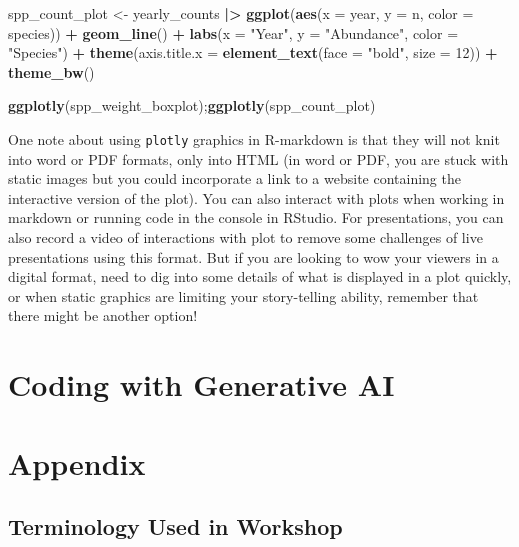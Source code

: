 \documentclass[
  10pt,
  letterpaper,
  twoside,
  openright]{book}
\newenvironment{Shaded}{\begin{snugshade}}{\end{snugshade}}
\newcommand{\AttributeTok}[1]{\textcolor[rgb]{0.13,0.29,0.53}{#1}}
\newcommand{\DecValTok}[1]{\textcolor[rgb]{0.00,0.00,0.81}{#1}}
\newcommand{\FunctionTok}[1]{\textcolor[rgb]{0.13,0.29,0.53}{\textbf{#1}}}
\newcommand{\NormalTok}[1]{#1}
\newcommand{\OtherTok}[1]{\textcolor[rgb]{0.56,0.35,0.01}{#1}}
\newcommand{\SpecialCharTok}[1]{\textcolor[rgb]{0.81,0.36,0.00}{\textbf{#1}}}
\newcommand{\StringTok}[1]{\textcolor[rgb]{0.31,0.60,0.02}{#1}}
\begin{document}
\begin{Shaded}
\begin{Highlighting}[]
\NormalTok{spp\_count\_plot }\OtherTok{\textless{}{-}}\NormalTok{ yearly\_counts }\SpecialCharTok{|\textgreater{}}
  \FunctionTok{ggplot}\NormalTok{(}\FunctionTok{aes}\NormalTok{(}\AttributeTok{x =}\NormalTok{ year, }\AttributeTok{y =}\NormalTok{ n, }\AttributeTok{color =}\NormalTok{ species)) }\SpecialCharTok{+}
  \FunctionTok{geom\_line}\NormalTok{() }\SpecialCharTok{+} 
  \FunctionTok{labs}\NormalTok{(}\AttributeTok{x =} \StringTok{"Year"}\NormalTok{, }
       \AttributeTok{y =} \StringTok{"Abundance"}\NormalTok{, }
       \AttributeTok{color =} \StringTok{"Species"}\NormalTok{) }\SpecialCharTok{+}
  \FunctionTok{theme}\NormalTok{(}\AttributeTok{axis.title.x =} \FunctionTok{element\_text}\NormalTok{(}\AttributeTok{face =} \StringTok{"bold"}\NormalTok{, }\AttributeTok{size =} \DecValTok{12}\NormalTok{)) }\SpecialCharTok{+}
  \FunctionTok{theme\_bw}\NormalTok{()}

\FunctionTok{ggplotly}\NormalTok{(spp\_weight\_boxplot);}\FunctionTok{ggplotly}\NormalTok{(spp\_count\_plot)}
\end{Highlighting}
\end{Shaded}

One note about using \texttt{plotly} graphics in R-markdown is that they
will not knit into word or PDF formats, only into HTML (in word or PDF,
you are stuck with static images but you could incorporate a link to a
website containing the interactive version of the plot). You can also
interact with plots when working in markdown or running code in the
console in RStudio. For presentations, you can also record a video of
interactions with plot to remove some challenges of live presentations
using this format. But if you are looking to wow your viewers in a
digital format, need to dig into some details of what is displayed in a
plot quickly, or when static graphics are limiting your story-telling
ability, remember that there might be another option!

\hypertarget{coding-with-generative-ai}{%
\chapter{Coding with Generative AI}\label{coding-with-generative-ai}}

\hypertarget{appendix}{%
\chapter{Appendix}\label{appendix}}

\hypertarget{terminology-used-in-workshop}{%
\section{Terminology Used in
Workshop}\label{terminology-used-in-workshop}}
\end{document}
